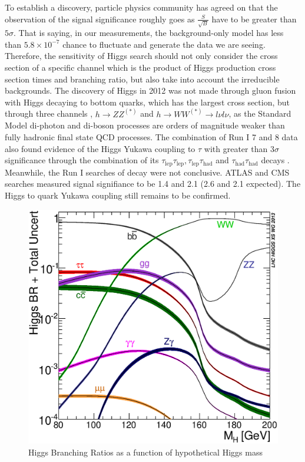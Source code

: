 To establish a discovery, particle physics community has agreed on that the observation of the signal significance roughly goes as $\frac{S}{\sqrt{B}}$ have to be greater than $5\sigma$. That is saying, in our measurements, the background-only model has less than $5.8\times 10^{-7}$ chance to fluctuate and generate the data we are seeing. Therefore, the sensitivity of Higgs search should not only consider the cross section of a specific channel which is the product of Higgs production cross section times and branching ratio, but also take into account the irreducible backgrounds. The discovery of Higgs in 2012 was not made through gluon fusion with Higgs decaying to bottom quarks, which has the largest cross section, but through three channels \Hgammagamma, $h\rightarrow ZZ^{(*)}$ and $h\rightarrow WW^{(*)}\rightarrow l\nu l\nu$\cite{HIGG-2012-27,CMS-HIG-12-028}, as the Standard Model di-photon and di-boson processes are orders of magnitude weaker than fully hadronic final state QCD processes. The combination of Run I 7 and 8 \tev data also found evidence of the Higgs Yukawa coupling to $\tau$ with greater than $3\sigma$ significance through the combination of its $\tau_{\text{lep}}\tau_{\text{lep}},\tau_{\text{lep}}\tau_{\text{had}}$ and $\tau_{\text{had}}\tau_{\text{had}}$ decays \cite{HIGG-2013-32,CMS-HIG-13-004}. Meanwhile, the Run I searches of \Hbb decay were not conclusive. ATLAS and CMS searches measured signal signifiance to be 1.4 and 2.1 (2.6 and 2.1 expected)\cite{HIGG-2013-23,CMS-HIG-13-012}. The Higgs to quark Yukawa coupling still remains to be confirmed. 

\begin{figure}[htpb!]
\begin{center}
  \includegraphics[width=0.45\linewidth]{figures/theory/Higgs_BR_LM.eps}
\caption{Higgs Branching Ratios as a function of hypothetical Higgs mass}
\label{fig:theory-higgsbr}
\end{center}
\end{figure}


